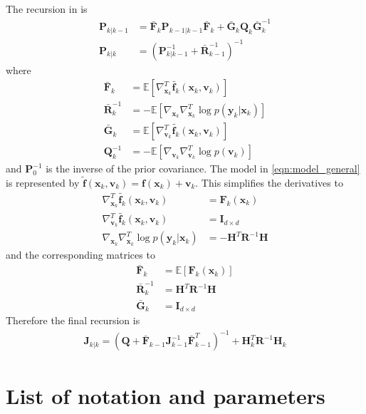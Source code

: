 \documentclass{article}
\renewcommand{\vec}[1]{\ensuremath{{\boldsymbol #1}}}
\newcommand{\mat}[1]{\ensuremath{\boldsymbol{#1}}}
\begin{document}
The recursion in \cite{Bergman2001} is
\begin{subequations}
\begin{align}
	\mat P_{k|k-1} &= \bar{\mat F}_k\mat P_{k-1|k-1}\bar{\mat F}_k + \bar{\mat G}_k\mat Q_k \bar{\mat G}_k^{-1} \\
		\mat P_{k|k} &= \left(\mat P_{k|k-1}^{-1} + \bar{\mat R}_{k-1}^{-1}\right)^{-1}
\end{align}
\end{subequations}
where
\begin{align}
	\bar{\mat F}_k &= \mathbb E \left[ \nabla_{\vec x_k}^T \tilde{\vec f_k}(\vec x_k,\vec v_k)\right] \\
	\bar{\mat R}_k^{-1} &= -\mathbb E\left[ \nabla_{\vec x_k}\nabla_{\vec x_k}^T \log p(\vec y_k|\vec x_k) \right] \\
	\bar{\mat G}_k &= \mathbb E \left[ \nabla_{\vec v_k}^T \tilde{\vec f_k}(\vec x_k,\vec v_k)\right] \\
	\mat Q_k^{-1} &= -\mathbb E \left[ \nabla_{\vec v_k}\nabla_{\vec v_k}^T \log p(\vec v_k) \right]
\end{align}
and $\mat P_0^{-1}$ is the inverse of the prior covariance. The model in \eqref{eqn:model_general} is represented by $\tilde{\vec f}(\vec x_k,\vec v_k) = \vec f(\vec x_k) + \vec v_k$. This simplifies the derivatives to
\begin{align}
	\nabla_{\vec x_k}^T \tilde{\vec f_k}(\vec x_k,\vec v_k) &= \mat F_k(\vec x_k) \\
	\nabla_{\vec v_k}^T \tilde{\vec f_k}(\vec x_k,\vec v_k) &= \mat I_{d\times d} \\
	\nabla_{\vec x_k}\nabla_{\vec x_k}^T \log p(\vec y_k|\vec x_k) &= -\mat H^T\mat R^{-1} \mat H 
\end{align}
and the corresponding matrices to	
\begin{align}
	\bar{\mat F}_k &= \mathbb E\left[ \mat F_k(\vec x_k)\right] \label{eqn:pcrb_term_F}\\
	\bar{\mat R}_k^{-1} &= \mat H^T\mat R^{-1} \mat H \\
	\bar{\mat G}_k &= \mat I_{d\times d} 
\end{align}
Therefore the final recursion is
\begin{align}
	\mat J_{k|k} = \left( \mat Q + \bar{\mat F}_{k-1} \mat J_{k-1}^{-1} \bar{\mat F}_{k-1}^T\right)^{-1} + \mat H_k^T \mat R^{-1} \mat H_k
\end{align}

\section{List of notation and parameters}
\label{sec:parameter_table}
\end{document}
